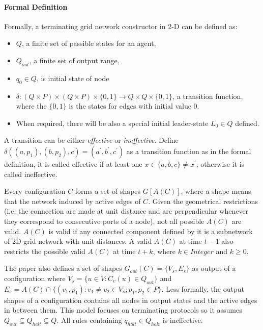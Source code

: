 \paragraph{Formal Definition}
Formally, a terminating grid network constructor in 2-D can be defined as:
\begin{itemize}
  \item $Q$, a finite set of passible states for an agent,
  \item $Q_{out}$, a finite set of output range,
  \item $q_{0} \in Q $, is initial state of node
  \item $\delta: (Q \times P ) \times (Q \times P) \times \{0,1\} \to Q \times Q \times \{0,1\}$, a transition function, where the $\{0,1\}$ is the states for edges with initial value 0.
  \item When required, there will be also a special initial leader-state $L_{0} \in Q $ defined.
\end{itemize}
\par
A transition can be either \textit{effective}
or \textit{ineffective}. Define $\delta((a, p_{1}), (b, p_{2}), c) = (a^{'}, b^{'},c^{'})$ as a transition function
as in the formal definition, it is called effective if at least one $x \in \{a,b,c\} \not= x^{'} $; otherwise it is called ineffective.

\par
Every configuration $C$ forms a set of shapes $G[A(C)]$, where a shape means that the network induced
by active edges of $C$. Given the geometrical restrictions (i.e. the connection are
made at unit distance and are perpendicular whenever they correspond to consecutive ports of a node),
not all possible $A(C)$ are valid. $A(C)$ is valid if any connected component defined by it is a
subnetwork of 2D grid network with unit distances. A valid $A(C)$ at time $t -1$ also restricts the
possible valid $A(C)$ at time $t + k$, where $k \in Integer$ and $k \geq 0 $.

\par
The paper \cite{Mi17} also defines a set of
shapes $G_{out}(C) = \{V_{s}, E_{s}\}$ as output of a configuration where $V_{s} = \{u \in V : C_{v}(u) \in Q_{out} \}$
and $E_{s} = A(C) \cap \{ (v_{1}, p_{1}) : v_{1} \not= v_{2} \in V_{s}; p_{1}, p_{2} \in P \}$.
Less formally, the output shapes of a configuration contains all nodes in output states and the active edges in between them.
This model focuses on terminating protocols so it assumes $Q_{out} \subseteq Q_{halt} \subseteq Q $.
All rules containing $q_{halt} \in Q_{halt} $ is ineffective.


